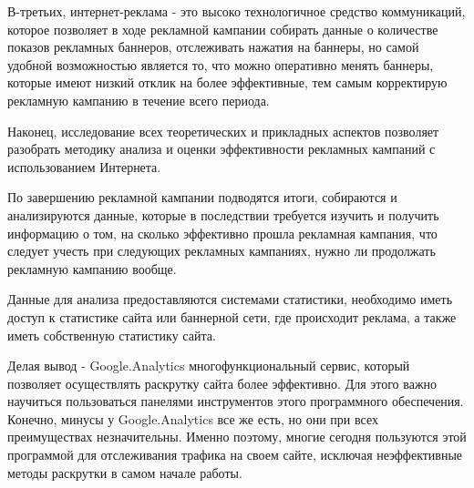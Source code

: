 \documentclass[a4paper,english,russian]{G2-105}
\begin{document}
\par В-третьих, интернет-реклама - это высоко технологичное средство коммуникаций, которое позволяет в ходе рекламной кампании собирать данные о количестве показов рекламных баннеров, отслеживать нажатия на баннеры, но самой удобной возможностью является то, что можно оперативно менять баннеры, которые имеют низкий отклик на более эффективные, тем самым корректирую рекламную кампанию в течение всего периода.
\par Наконец, исследование всех теоретических и прикладных аспектов позволяет разобрать методику анализа и оценки эффективности рекламных кампаний с использованием Интернета.
\par По завершению рекламной кампании подводятся итоги, собираются и анализируются данные, которые в последствии требуется изучить и получить информацию о том, на сколько эффективно прошла рекламная кампания, что следует учесть при следующих рекламных кампаниях, нужно ли продолжать рекламную кампанию вообще.
\par Данные для анализа предоставляются системами статистики, необходимо иметь доступ к статистике сайта или баннерной сети, где происходит реклама, а также иметь собственную статистику сайта.
\par Делая вывод - Google.Analytics многофункциональный сервис, который позволяет осуществлять раскрутку сайта более эффективно. Для этого важно научиться пользоваться панелями инструментов этого программного обеспечения. Конечно, минусы у Google.Analytics все же есть, но они при всех преимуществах незначительны. Именно поэтому, многие сегодня пользуются этой программой для отслеживания трафика на своем сайте, исключая неэффективные методы раскрутки в самом начале работы.
\end{document}
